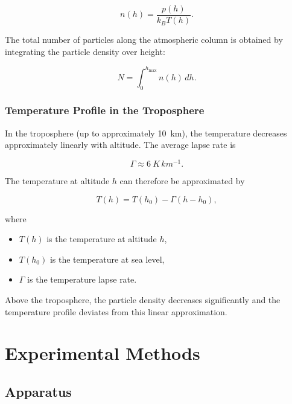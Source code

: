 \begin{equation}
    n(h) = \frac{p(h)}{k_B T(h)}.
    \label{Equation: Ideal Gas Law}
\end{equation}


The total number of particles along the atmospheric column is obtained
by integrating the particle density over height:

\begin{equation}
    N = \int_0^{h_{\text{max}}} n(h)\, dh.
\end{equation}

\subsubsection*{Temperature Profile in the Troposphere}

In the troposphere (up to approximately \SI{10}{km}),
the temperature decreases approximately linearly with altitude.
The average lapse rate is

\begin{equation}
\Gamma \approx \SI{6}{K\,km^{-1}}.
\end{equation}

The temperature at altitude $h$ can therefore be approximated by

\begin{equation}
T(h) = T(h_0) - \Gamma (h - h_0),
\end{equation}

where

\begin{itemize}
    \item $T(h)$ is the temperature at altitude $h$,
    \item $T(h_0)$ is the temperature at sea level,
    \item $\Gamma$ is the temperature lapse rate.
\end{itemize}

Above the troposphere, the particle density decreases significantly and
the temperature profile deviates from this linear approximation.

\newpage

\section{Experimental Methods}

\subsection{Apparatus}

